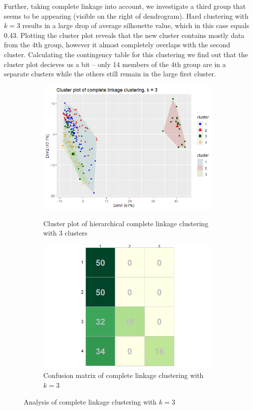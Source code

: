 \documentclass[12pt]{article}
\begin{document}
Further, taking complete linkage into account, we investigate a third group that seems to be appearing (visible on the right of dendrogram). Hard clustering with
$k = 3$ results in a large drop of average silhouette value, which in this case equals 0.43. Plotting the cluster plot reveals that the new cluster contains
mostly data from the 4th group, however it almost completely overlaps with the second cluster. Calculating the contingency table for this clustering we find out
that the cluster plot decieves us a bit -- only 14 members of the 4th group are in a separate clusters while the others still remain in the large first cluster.
\begin{figure}[h]
  \begin{subfigure}[b]{0.5\linewidth}
      \centering
      \includegraphics[width=\textwidth]{../images/project2/clusPlot_cmt3.png}
      \label{fig:clusPlot_cmt3}
      \caption{Cluster plot of hierarchical complete linkage clustering with 3 clusters}
  \end{subfigure}%
  \begin{subfigure}[b]{0.5\linewidth}
      \centering
   \includegraphics[width=\textwidth]{../images/project2/confMat_comp3.png}
   \caption{Confusion matrix of complete linkage clustering with $k=3$}\label{fig:confMat_comp3}
  \end{subfigure}%
 \caption{Analysis of complete linkage clustering with $k=3$}
\end{figure}
\end{document}
